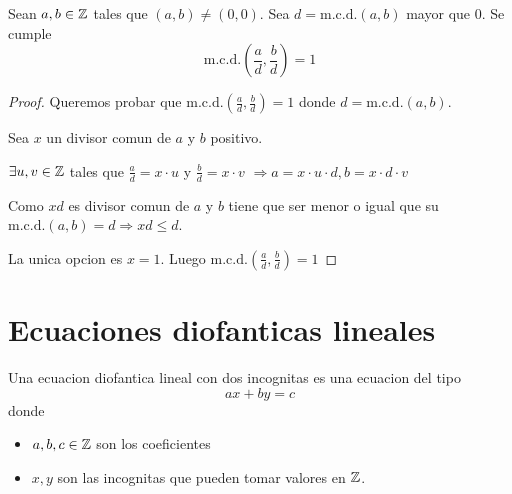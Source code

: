 \begin{lemma}
	\label{mcd1}
	Sean \(a,b \in \mathbb{Z} \) tales que \((a,b) \neq (0,0)\). Sea \(d = \mathrm{m.c.d.}(a,b) \) mayor que 0. Se cumple
	\[
		\mathrm{m.c.d.}\left (\frac{a}{d}, \frac{b }{d} \right ) = 1
	\]
\end{lemma}
\begin{proof}
	Queremos probar que \(\mathrm{m.c.d.}(\frac{a}{d},\frac{b}{d}) = 1  \) donde \(d = \mathrm{m.c.d.}(a,b) \).
	
	Sea \(x \) un divisor comun de \(a \) y \(b \) positivo.
	
	\(\exists u,v \in \mathbb{Z} \) tales que \(\frac{a}{d} = x \cdot u \) y \(\frac{b}{d} = x \cdot v \) \(\Rightarrow a = x \cdot u \cdot d, b = x \cdot d \cdot v\)
	
	Como \(xd\) es divisor comun de \(a \) y \(b \) tiene que ser menor o igual que su \(\mathrm{m.c.d.}(a,b) = d \Rightarrow xd \leq d\).
	
	La unica opcion es \(x = 1 \). Luego \(\mathrm{m.c.d.}(\frac{a}{d}, \frac{b}{d}) = 1 \)
\end{proof}

\section{Ecuaciones diofanticas lineales}
\begin{definition}
	Una ecuacion diofantica lineal con dos incognitas es una ecuacion del tipo
	\[
		ax + by = c
	\]
	donde
	\begin{itemize}
		\item \(a,b,c \in \mathbb{Z} \) son los coeficientes
		\item \(x,y \) son las incognitas que pueden tomar valores en \(\mathbb{Z} \).
	\end{itemize}
\end{definition}

